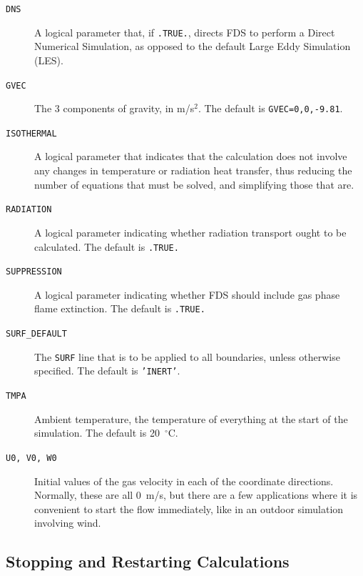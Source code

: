 \documentclass[11pt]{book}
\newcommand{\ct}{\tt\small}
\begin{document}
\begin{description}
\item[{\ct DNS}] A logical parameter that, if {\ct .TRUE.}, directs FDS to perform a Direct Numerical Simulation, as opposed to the default Large Eddy Simulation (LES).
\item[{\ct GVEC}] The 3 components of gravity, in m/s$^2$. The default is {\ct GVEC=0,0,-9.81}.
\item[{\ct ISOTHERMAL}] A logical parameter that indicates that the calculation does not involve any changes in temperature or
radiation heat transfer, thus reducing the number of equations that must be solved, and simplifying those that are.
\item[{\ct RADIATION}] A logical parameter indicating whether radiation transport ought to be calculated. The default is {\ct .TRUE.}
\item[{\ct SUPPRESSION}] A logical parameter indicating whether FDS should include gas phase flame extinction. The default is {\ct .TRUE.}
\item[{\ct SURF\_DEFAULT}] The {\ct SURF} line that is to be applied to all boundaries, unless otherwise specified. The default is {\ct 'INERT'}.
\item[{\ct TMPA}] Ambient temperature, the temperature of everything at the start of the simulation. The default is 20~$^\circ$C.
\item[{\ct U0, V0, W0}] Initial values of the gas velocity in each of the coordinate directions. Normally, these are all 0~m/s, but there are a few applications where it is
convenient to start the flow immediately, like in an outdoor simulation involving wind.
\end{description}

\subsection{Stopping and Restarting Calculations}
\label{info:restart}
\end{document}
